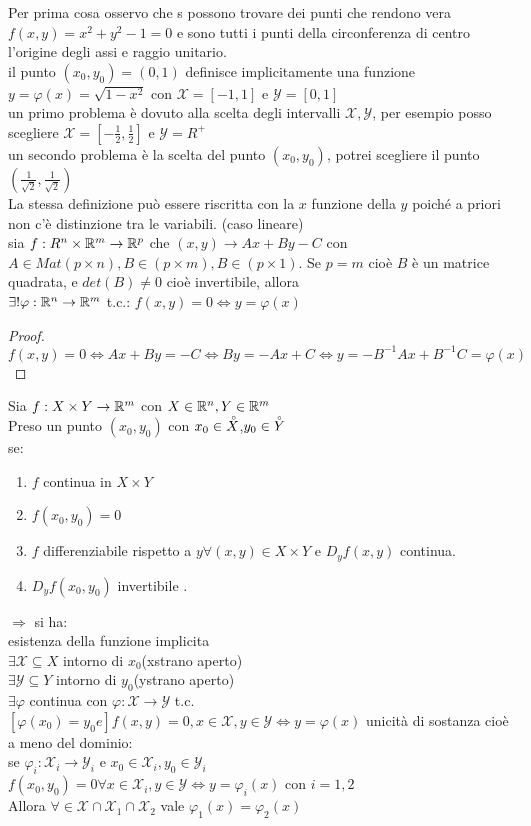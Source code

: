	Per prima cosa osservo che s possono trovare dei punti che rendono vera $f(x,y)=x^2+y^2-1=0$ e sono tutti i punti della circonferenza di centro l'origine degli assi e raggio unitario.\\
	il punto $(x_0,y_0)=(0,1)$ definisce implicitamente una funzione $y=\varphi(x)=\sqrt{1-x^2}$ con $\mathcal{X}=[-1,1]$ e $\mathcal{Y}=[0,1]$\\
	un primo problema è dovuto alla scelta degli intervalli $\mathcal{X},\mathcal{Y}$, per esempio posso scegliere $\mathcal{X}=[-\frac{1}{2},\frac{1}{2}]$ e $\mathcal{Y}=R^+$\\
	un secondo problema è la scelta del punto $(x_0,y_0)$, potrei scegliere il punto $(\frac{1}{\sqrt{2}},\frac{1}{\sqrt{2}})$\\
\observation
La stessa definizione può essere riscritta con la $x$ funzione della $y$ poiché a priori non c'è distinzione tra le variabili.
\proposition (caso lineare)\\
sia $f:R^n\times \mathbb{R}^m\rightarrow \mathbb{R}^p$ che $(x,y)\rightarrow Ax+By-C$ con $A\in Mat(p \times n), B\in (p \times m), B\in (p \times 1)$. Se $p=m$ cioè $B$ è un matrice quadrata, e $det(B)\ne 0$ cioè invertibile, allora\\
$\exists !\varphi : \mathbb{R}^n\rightarrow \mathbb{R}^m$ t.c.: $f(x,y)=0 \Leftrightarrow y=\varphi(x)$
\begin{proof}
	$f(x,y)=0\Leftrightarrow Ax+By=-C\Leftrightarrow By=-Ax+C\Leftrightarrow y=-B^{-1}Ax+B^{-1}C = \varphi(x)$
\end{proof}
\proposition
Sia $f:X\times Y\rightarrow \mathbb{R}^m$ con $X\in \mathbb{R}^n, Y\in \mathbb{R}^m$\\
Preso un punto $(x_0,y_0)$ con $x_0\in \accentset{\circ}{X}$,$y_0\in \accentset{\circ}{Y}$\\
se:
\begin{enumerate}
	\item $f$ continua in $X\times Y$
	\item $f(x_0,y_0)=0$
	\item $f$ differenziabile rispetto a $y \forall (x,y)\in X\times Y$ e $D_yf(x,y)$ continua.
	\item $D_yf(x_0,y_0)$ invertibile .
\end{enumerate}
$\Rightarrow $ si ha:\\
esistenza della funzione implicita\\
$\exists \mathcal{X}\subseteq X$ intorno di $x_0$(xstrano aperto)\\
$\exists \mathcal{Y}\subseteq Y$ intorno di $y_0$(ystrano aperto)\\
$\exists\varphi$ continua con $\varphi:\mathcal{X}\rightarrow\mathcal{Y}$ t.c. $[\varphi (x_0)=y_0 e] f(x,y)=0, x\in\mathcal{X},y\in\mathcal{Y} \Leftrightarrow y=\varphi(x)$
unicità di sostanza cioè a meno del dominio:\\
se $\varphi_i:\mathcal{X}_i\rightarrow\mathcal{Y}_i$ e $x_0\in\mathcal{X}_i,y_0\in\mathcal{Y}_i$\\
$f(x_0,y_0)=0 \forall x\in\mathcal{X}_i, y\in \mathcal{Y}\Leftrightarrow y=\varphi_i(x)$ con $i=1,2$\\
Allora $\forall\in\mathcal{X}\cap\mathcal{X}_1\cap\mathcal{X}_2$ vale $\varphi_1(x)=\varphi_2(x)$


